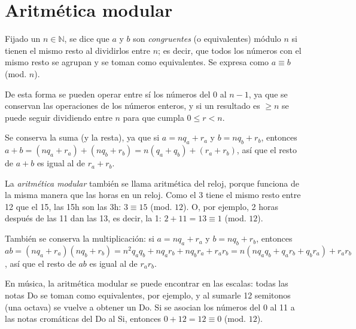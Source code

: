 	\section{Aritmética modular}
		Fijado un $n\in\mathbb{N}$, se dice que $a$ y $b$ son \textit{congruentes} (o equivalentes) módulo $n$ si tienen el mismo resto al dividirlos entre $n$; es decir, que todos los números con el mismo resto se agrupan y se toman como equivalentes. Se expresa como $a\equiv b$ (mod. $n$).
	
		De esta forma se pueden operar entre sí los números del 0 al $n-1$, ya que se conservan las operaciones de los números enteros, y si un resultado es $\geq n$ se puede seguir dividiendo entre $n$ para que cumpla $0\leq r<n$.
		
		Se conserva la suma (y la resta), ya que si $a=nq_a+r_a$ y $b=nq_b+r_b$, entonces $a+b=(nq_a+r_a)+(nq_b+r_b)=n(q_a+q_b)+(r_a+r_b)$, así que el resto de $a+b$ es igual al de $r_a+r_b$.
		
		La \textit{aritmética modular} también se llama aritmética del reloj, porque funciona de la misma manera que las horas en un reloj. Como el 3 tiene el mismo resto entre 12 que el 15, las 15h son las 3h: $3\equiv15$ (mod. $12$). O, por ejemplo, 2 horas después de las 11 dan las 13, es decir, la 1: $2+11=13\equiv1$ (mod. $12$). 
		
		También se conserva la multiplicación: si $a=nq_a+r_a$ y $b=nq_b+r_b$, entonces $ab=(nq_a+r_a)(nq_b+r_b)=n^2q_aq_b+nq_ar_b+nq_br_a+r_ar_b=n(nq_aq_b+q_ar_b+q_br_a)+r_ar_b$, así que el resto de $ab$ es igual al de $r_ar_b$.
		
		En música, la aritmética modular se puede encontrar en las escalas: todas las notas Do se toman como equivalentes, por ejemplo, y al sumarle 12 semitonos (una octava) se vuelve a obtener un Do. Si se asocian los números del 0 al 11 a las notas cromáticas del Do al Si, entonces $0+12=12\equiv0$ (mod. $12$).